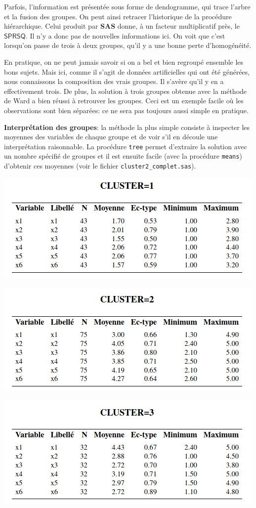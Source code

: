 \documentclass[
  11pt,
  letterpaper,
]{book}
\theoremstyle{definition}
\theoremstyle{definition}
\theoremstyle{definition}
\theoremstyle{definition}
\theoremstyle{remark}
\begin{document}
Parfois, l'information est présentée sous forme de dendogramme, qui trace l'arbre et la fusion des groupes. On peut ainsi retracer l'historique de la procédure hiérarchique. Celui produit par \textbf{SAS} donne, à un facteur multiplicatif près, le \(\mathsf{SPRSQ}\). Il n'y a donc pas de nouvelles informations ici. On voit que c'est lorsqu'on passe de trois à deux groupes, qu'il y a une bonne perte d'homogénéité.

En pratique, on ne peut jamais savoir si on a bel et bien regroupé ensemble les bons sujets. Mais ici, comme il s'agit de données artificielles qui ont été générées, nous connaissons la composition des vrais groupes. Il s'avère qu'il y en a effectivement trois. De plus, la solution à trois groupes obtenue avec la méthode de Ward a bien réussi à retrouver les groupes. Ceci est un exemple facile où les observations sont bien séparées: ce ne sera pas toujours aussi simple en pratique.

\textbf{Interprétation des groupes}: la méthode la plus simple consiste à inspecter les moyennes des variables de chaque groupe et de voir s'il en découle une interprétation raisonnable. La procédure \texttt{tree} permet d'extraire la solution avec un nombre spécifié de groupes et il est ensuite facile (avec la procédure \texttt{means}) d'obtenir ces moyennes (voir le fichier \texttt{cluster2\_complet.sas}).

\begin{center}\includegraphics[width=0.55\linewidth]{figures/04-clustering-e11} \end{center}

\begin{center}\includegraphics[width=0.55\linewidth]{figures/04-clustering-e12} \end{center}

\begin{center}\includegraphics[width=0.55\linewidth]{figures/04-clustering-e13} \end{center}
\end{document}
